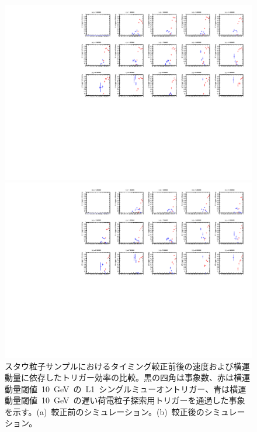 \begin{figure}[H]
    \begin{minipage}{0.49\hsize}
    \centering   
    \includegraphics[width=\textwidth,page=15]{img/rec/stau_600_ori.pdf}
    \subcaption{}
    \end{minipage}
    \begin{minipage}{0.49\hsize}
    \centering   
    \includegraphics[width=\textwidth,page=15]{img/rec/stau_600.pdf}
    \subcaption{}
    \end{minipage}
    \caption[スタウ粒子サンプルにおけるタイミング較正前後の速度および横運動量に依存したトリガー効率の比較]{スタウ粒子サンプルにおけるタイミング較正前後の速度および横運動量に依存したトリガー効率の比較。黒の四角は事象数、赤は横運動量閾値~10~GeV~の~L1~シングルミューオントリガー、青は横運動量閾値~10~GeV~の遅い荷電粒子探索用トリガーを通過した事象を示す。(a)~較正前のシミュレーション。(b)~較正後のシミュレーション。}\label{fig:triptbeta}
\end{figure}
